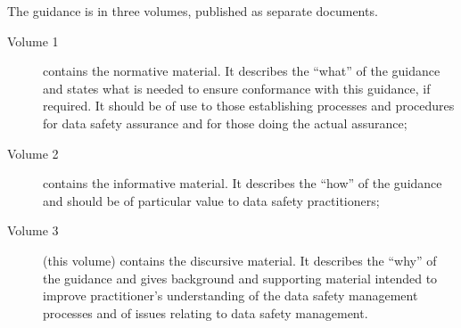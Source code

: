 The guidance is in three volumes, published as separate documents.
\begin{description}
	\item[Volume 1] contains the normative material. It describes the ``what'' of the guidance and states what is needed to ensure conformance with this guidance, if required. It should be of use to those establishing processes and procedures for data safety assurance and for those doing the actual assurance;
	\item[Volume 2] contains the informative material. It describes the ``how'' of the guidance and should be of particular value to data safety practitioners;
	\item[Volume 3] (this volume) contains the discursive material. It describes the ``why'' of the guidance and gives background and supporting material intended to improve practitioner's understanding of the data safety management processes and of issues relating to data safety management.
\end{description}
	
